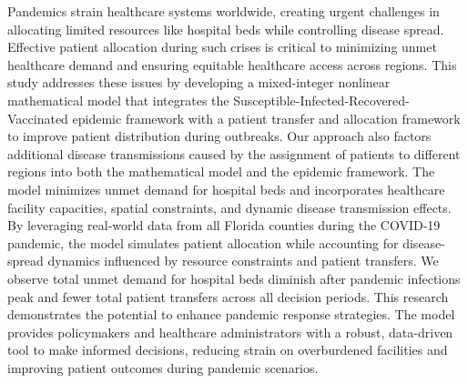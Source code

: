 \documentclass{article}
\begin{document}
  \fontsize{10}{12}\selectfont




  \begin{ieomabstract}
      Pandemics strain healthcare systems worldwide, creating urgent challenges in allocating limited resources like hospital beds while controlling disease spread. Effective patient allocation during such crises is critical to minimizing unmet healthcare demand and ensuring equitable healthcare access across regions. This study addresses these issues by developing a mixed-integer nonlinear mathematical model that integrates the Susceptible-Infected-Recovered-Vaccinated epidemic framework with a patient transfer and allocation framework to improve patient distribution during outbreaks. Our approach also factors additional disease transmissions caused by the assignment of patients to different regions into both the mathematical model and the epidemic framework. The model minimizes unmet demand for hospital beds and incorporates healthcare facility capacities, spatial constraints, and dynamic disease transmission effects. By leveraging real-world data from all Florida counties during the COVID-19 pandemic, the model simulates patient allocation while accounting for disease-spread dynamics influenced by resource constraints and patient transfers. We observe total unmet demand for hospital beds diminish after pandemic infections peak and fewer total patient transfers across all decision periods. This research demonstrates the potential to enhance pandemic response strategies. The model provides policymakers and healthcare administrators with a robust, data-driven tool to make informed decisions, reducing strain on overburdened facilities and improving patient outcomes during pandemic scenarios.
  \end{ieomabstract}
\end{document}
